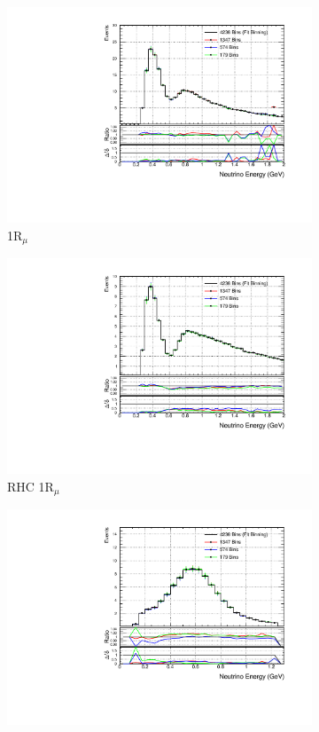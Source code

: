 \begin{figure}
\centering
\begin{subfigure}{.49\textwidth}
  \centering
  \includegraphics[width=0.95\linewidth]{figs/detbin_numu}
  \caption{1R$_{\mu}$}
\end{subfigure}
\begin{subfigure}{.49\textwidth}
  \centering
  \includegraphics[width=0.95\linewidth]{figs/detbin_numubar}
  \caption{RHC 1R$_{\mu}$}
\end{subfigure}
\begin{subfigure}{.49\textwidth}
  \centering
  \includegraphics[width=0.95\linewidth]{figs/detbin_nue}

\end{subfigure}
\end{figure}
